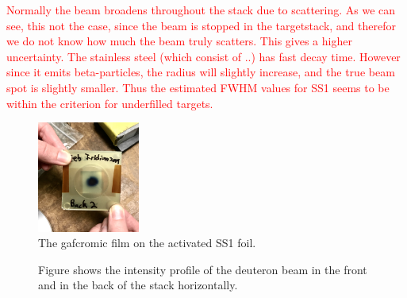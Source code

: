 \documentclass[a4paper,11pt,twoside]{book}
\begin{document}
\textcolor{red}{Normally the beam broadens throughout the stack due to scattering. As we can see, this not the case, since the beam is stopped in the targetstack, and therefor we do not know how much the beam truly scatters. This gives a higher uncertainty.  
The stainless steel (which consist of ..) has fast decay time. However since it emits beta-particles, the radius will slightly increase, and the true beam spot is slightly smaller. Thus the estimated FWHM values for SS1  seems to be within the criterion for underfilled targets. }



\begin{figure}
    \centering
    \includegraphics[width=0.3\textwidth]{Experiment/gafchromic_beamprofile.jpg}
    \caption{The gafcromic film on the activated SS1 foil. }
    \label{fig:SS1_gafchromic}
\end{figure}

\begin{figure}%
    \centering
    
    \quad
    \caption{Figure shows the intensity profile of the deuteron beam in the front and in the back of the stack horizontally.}%
    \label{fig:beamprofile}%
\end{figure}
\end{document}
